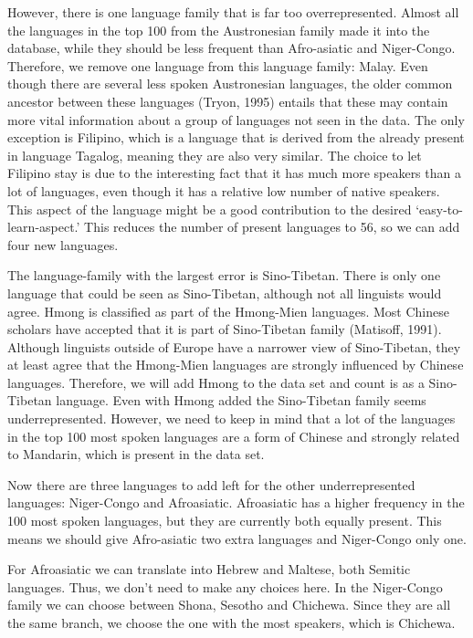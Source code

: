 However, there is one language family that is far too overrepresented. Almost all the languages in the top 100 from the Austronesian family made it into the  database, while they should be less frequent than Afro-asiatic and Niger-Congo. Therefore, we remove one language from this language family: Malay. Even though there are several less spoken Austronesian languages, the older common ancestor between these languages (Tryon, 1995) entails that these may contain more vital information about a group of languages not seen in the data. The only exception is Filipino, which is a language that is derived from the already present in  language Tagalog, meaning they are also very similar. The choice to let Filipino stay is due to the interesting fact that it has much more speakers than a lot of languages, even though it has a relative low number of native speakers. This aspect of the language might be a good contribution to the desired ‘easy-to-learn-aspect.’ This reduces the number of present languages to 56, so we can add four new languages. 

The language-family with the largest error is Sino-Tibetan. There is only one language that could be seen as Sino-Tibetan, although not all linguists would agree. Hmong is classified as part of the Hmong-Mien languages. Most Chinese scholars have accepted that it is part of Sino-Tibetan family (Matisoff, 1991). Although linguists outside of Europe have a narrower view of Sino-Tibetan, they at least agree that the Hmong-Mien languages are strongly influenced by Chinese languages. Therefore, we will add Hmong to the data set and count is as a Sino-Tibetan language. Even with Hmong added the Sino-Tibetan family seems underrepresented. However, we need to keep in mind that a lot of the languages in the top 100 most spoken languages are a form of Chinese and strongly related to Mandarin, which is present in the data set. 

Now there are three languages to add left for the other underrepresented languages: Niger-Congo and Afroasiatic. Afroasiatic has a higher frequency in the 100 most spoken languages, but they are currently both equally present. This means we should give Afro-asiatic two extra languages and Niger-Congo only one.  

For Afroasiatic we can translate into Hebrew and Maltese, both Semitic languages. Thus, we don’t need to make any choices here. In the Niger-Congo family we can choose between Shona, Sesotho and Chichewa. Since they are all the same branch, we choose the one with the most speakers, which is Chichewa.   

